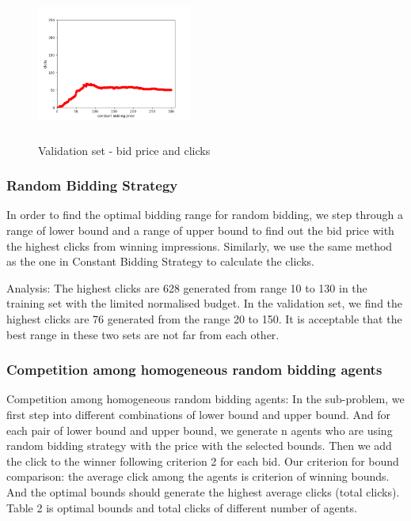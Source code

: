 \documentclass{sig-alternate-05-2015}
\begin{document}
\begin{figure}
\centering
\includegraphics[height=2in, width=2in]{images/constant_bidding_validation.png}
\caption{Validation set - bid price and clicks}
\end{figure}




\subsubsection{Random Bidding Strategy}
In order to find the optimal bidding range for random bidding, we step through a range of lower bound and a range of upper bound to find out the bid price with the highest clicks from winning impressions. Similarly, we use the same method as the one in Constant Bidding Strategy to calculate the clicks. 

Analysis: 
The highest clicks are 628 generated from range 10 to 130 in the training set with the limited normalised budget. In the validation set, we find the highest clicks are 76 generated from the range 20 to 150. It is acceptable that the best range in these two sets are not far from each other.


\subsubsection{Competition among homogeneous random bidding agents}

Competition among homogeneous random bidding agents:
In the sub-problem, we first step into different combinations of lower bound and upper bound. And for each pair of lower bound and upper bound, we generate n agents who are using random bidding strategy with the price with the selected bounds. Then we add the click to the winner following criterion 2 for each bid. 
Our criterion for bound comparison: the average click among the agents is criterion of winning bounds. And the optimal bounds should generate the highest average clicks (total clicks). Table 2 is  optimal bounds and total clicks of different number of agents. 
\end{document}
